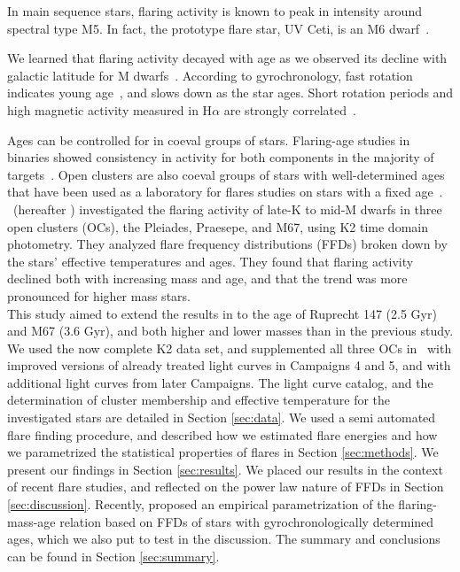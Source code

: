 \documentclass{aa}
\begin{document}
In main sequence stars, flaring activity is known to peak in intensity around spectral type M5. In fact, the prototype flare star, UV Ceti, is an M6 dwarf~\citep{kirkpatrick1991}.

We learned that flaring activity decayed with age as we observed its decline with galactic latitude for M dwarfs~\citep{hilton2010, walkowicz2011, howard2019}. According to gyrochronology, fast rotation indicates young age~\citep{barnes_rotational_2003}, and slows down as the star ages. Short rotation periods and high magnetic activity measured in H$\alpha$ are strongly correlated~\citep{west_magneticrotationage_2015}. 


Ages can be controlled for in coeval groups of stars. Flaring-age studies in binaries showed consistency in activity for both components in the majority of targets~\citep{lurie2015, clarke_flare_2018}. Open clusters are also coeval groups of stars with well-determined ages that have been used as a laboratory for flares studies on stars with a fixed age~\citep{chang2015}. \citet{ilin_flares_2019}~(hereafter ) investigated the flaring activity of late-K to mid-M dwarfs in three open clusters (OCs), the Pleiades, Praesepe, and M67, using K2 time domain photometry. They analyzed flare frequency distributions (FFDs) broken down by the stars' effective temperatures and ages. They found that flaring activity declined both with increasing mass and age, and that the trend was more pronounced for higher mass stars. 
\\
This study aimed to extend the results in  to the age of Ruprecht 147 (2.5 Gyr) and M67 (3.6 Gyr), and both higher and lower masses than in the previous study. We used the now complete K2 data set, and supplemented all three OCs in~ with improved versions of already treated light curves in Campaigns 4 and 5, and with additional light curves from later Campaigns. The light curve catalog, and the determination of cluster membership and effective temperature for the investigated stars are detailed in Section \ref{sec:data}. We used a semi automated flare finding procedure, and described how we estimated flare energies and how we parametrized the statistical properties of flares in Section \ref{sec:methods}. We present our findings in Section \ref{sec:results}. We placed our results in the context of recent flare studies, and reflected on the power law nature of FFDs in Section \ref{sec:discussion}. Recently, \citet{davenport2019} proposed an empirical parametrization of the flaring-mass-age relation based on FFDs of stars with gyrochronologically determined ages, which we also put to test in the discussion. The summary and conclusions can be found in Section \ref{sec:summary}.
\end{document}
